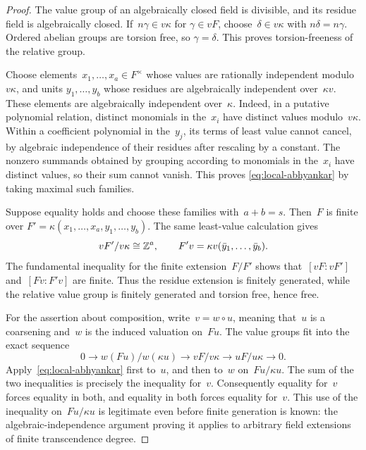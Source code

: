\begin{proof}
The value group of an algebraically closed field is divisible, and its
residue field is algebraically closed.  If~\(n\gamma\in v\kappa\) for
\(\gamma\in vF\), choose~\(\delta\in v\kappa\) with
\(n\delta=n\gamma\).  Ordered abelian groups are torsion free, so
\(\gamma=\delta\).  This proves torsion-freeness of the relative group.

Choose elements~\(x_1,\ldots,x_a\in F^\times\) whose values are
rationally independent modulo~\(v\kappa\), and units
\(y_1,\ldots,y_b\) whose residues are algebraically independent
over~\(\kappa v\).  These elements are algebraically independent
over~\(\kappa\).  Indeed, in a putative polynomial relation, distinct
monomials in the~\(x_i\) have distinct values modulo~\(v\kappa\).
Within a coefficient polynomial in the~\(y_j\), its terms of least
value cannot cancel, by algebraic independence of their residues after
rescaling by a constant.  The nonzero summands obtained by grouping
according to monomials in the~\(x_i\) have distinct values, so their
sum cannot vanish.  This proves
\eqref{eq:local-abhyankar} by taking maximal such families.

Suppose equality holds and choose these families with~\(a+b=s\).
Then~\(F\) is finite over
\(F'=\kappa(x_1,\ldots,x_a,y_1,\ldots,y_b)\).  The same least-value
calculation gives
\[
 vF'/v\kappa\cong\mathbb Z^a,\qquad
 F'v=\kappa v(\bar y_1,\ldots,\bar y_b).
\]
The fundamental inequality for the finite extension~\(F/F'\) shows
that~\([vF:vF']\) and~\([Fv:F'v]\) are finite.  Thus the residue
extension is finitely generated, while the relative value group is
finitely generated and torsion free, hence free.

For the assertion about composition, write~\(v=w\circ u\), meaning
that~\(u\) is a coarsening and~\(w\) is the induced valuation on~\(Fu\).
The value groups fit into the exact sequence
\[
 0\longrightarrow w(Fu)/w(\kappa u)
 \longrightarrow vF/v\kappa
 \longrightarrow uF/u\kappa\longrightarrow0.
\]
Apply~\eqref{eq:local-abhyankar} first to~\(u\), and then to~\(w\)
on~\(Fu/\kappa u\).  The sum of the two inequalities is precisely the
inequality for~\(v\).  Consequently equality for~\(v\) forces equality
in both, and equality in both forces equality for~\(v\).  This use of
the inequality on~\(Fu/\kappa u\) is legitimate even before finite
generation is known: the algebraic-independence argument proving it
applies to arbitrary field extensions of finite transcendence degree.
\end{proof}


